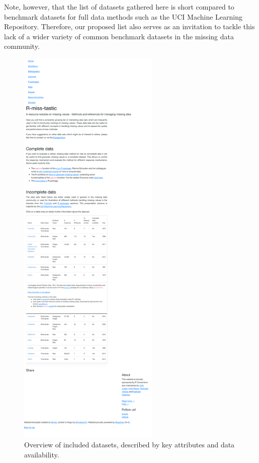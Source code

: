 Note, however, that the list of datasets gathered here is short compared to benchmark datasets for full data methods such as the UCI Machine Learning Repository. Therefore, our proposed list also serves as an invitation to tackle this lack of a wider variety of common benchmark datasets in the missing data community. %

\begin{figure}
\begin{center}
\includegraphics[width=0.6\textwidth]{figures/local-data.pdf}
\end{center}
\caption{Overview of included datasets, described by key attributes and data availability. \label{fig:datasets}}
\end{figure}


